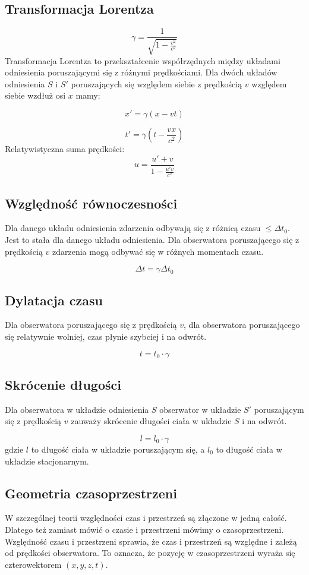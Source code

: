 \documentclass{../notatki}
\begin{document}
\subsection{Transformacja Lorentza}

$$
\gamma = \frac{1}{\sqrt{1 - \frac{v^2}{c^2}}}
$$
Transformacja Lorentza to przekształcenie współrzędnych między układami
odniesienia poruszającymi się z różnymi prędkościami. Dla dwóch układów
odniesienia $S$ i $S'$ poruszających się względem siebie z prędkością $v$
względem siebie wzdłuż osi $x$ mamy:

$$
x' = \gamma(x - vt)
$$

$$
t' = \gamma(t - \frac{vx}{c^2})
$$
Relatywistyczna suma prędkości:
$$
u = \frac{u' + v}{1 - \frac{u'v}{c^2}}
$$

\subsection{Względność równoczesności}

Dla danego układu odniesienia zdarzenia odbywają się z różnicą czasu
$\le \Delta t_0$. Jest to stała dla danego układu odniesienia.
Dla obserwatora poruszającego się z prędkością $v$ zdarzenia
mogą odbywać się w różnych momentach czasu.

$$
\Delta t = \gamma \Delta t_0
$$

\subsection{Dylatacja czasu}

Dla obserwatora poruszającego się z prędkością $v$, dla obserwatora
poruszającego
się relatywnie wolniej, czas płynie szybciej i na odwrót.

$$
t = t_0 \cdot \gamma
$$

\subsection{Skrócenie długości}

Dla obserwatora w układzie odniesienia $S$ obserwator w układzie $S'$
poruszającym się z prędkością $v$ zauważy skrócenie długości ciała
w układzie $S$ i na odwrót.

$$
l = l_0 \cdot \gamma
$$
gdzie $l$ to długość ciała w układzie poruszającym się, a $l_0$ to długość
ciała w układzie stacjonarnym.

\subsection{Geometria czasoprzestrzeni}

W szczególnej teorii względności czas i przestrzeń są złączone w jedną
całość. Dlatego też zamiast mówić o czasie i przestrzeni mówimy o
czasoprzestrzeni.
Względność czasu i przestrzeni sprawia, że czas i przestrzeń są względne
i zależą od prędkości obserwatora. To oznacza, że pozycję w czasoprzestrzeni
wyraża się czterowektorem $(x, y, z, t)$.
\end{document}

